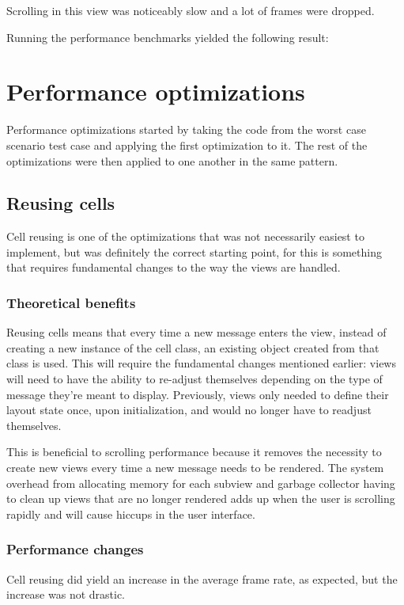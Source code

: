 \documentclass[a4paper,12pt]{article}
\begin{document}
Scrolling in this view was noticeably slow and a lot of frames were dropped.

Running the performance benchmarks yielded the following result:

\newpage
\section{Performance optimizations}
Performance optimizations started by taking the code from the worst case scenario test case and applying the first optimization to it. The rest of the optimizations were then applied to one another in the same pattern.

\subsection{Reusing cells}
Cell reusing is one of the optimizations that was not necessarily easiest to implement, but was definitely the correct starting point, for this is something that requires fundamental changes to the way the views are handled.

\subsubsection*{Theoretical benefits}
Reusing cells means that every time a new message enters the view, instead of creating a new instance of the cell class, an existing object created from that class is used. This will require the fundamental changes mentioned earlier: views will need to have the ability to re-adjust themselves depending on the type of message they're meant to display. Previously, views only needed to define their layout state once, upon initialization, and would no longer have to readjust themselves.

This is beneficial to scrolling performance because it removes the necessity to create new views every time a new message needs to be rendered. The system overhead from allocating memory for each subview and garbage collector having to clean up views that are no longer rendered adds up when the user is scrolling rapidly and will cause hiccups in the user interface.

\subsubsection*{Performance changes}
Cell reusing did yield an increase in the average frame rate, as expected, but the increase was not drastic.
\end{document}
